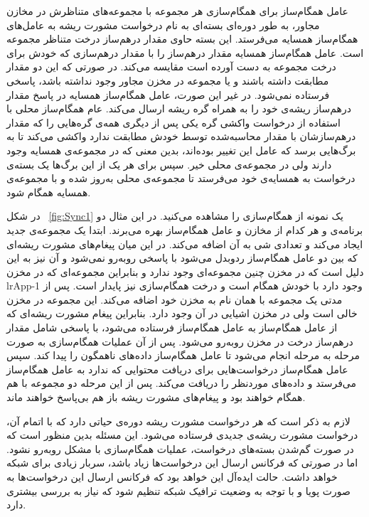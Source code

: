 عامل همگام‌ساز برای همگام‌سازی هر مجموعه با مجموعه‌های متناظرش در مخازن مجاور، به طور دوره‌ای بسته‌ای به نام درخواست مشورت ریشه به عامل‌های همگام‌ساز همسایه می‌فرستد. این بسته حاوی مقدار درهم‌ساز درخت متناظر مجموعه است. عامل همگام‌ساز همسایه مقدار در‌هم‌ساز را با مقدار در‌هم‌سازی که خودش برای درخت مجموعه به دست آورده است مقایسه می‌کند. در صورتی که این دو مقدار مطابقت داشته باشند و یا مجموعه در مخزن مجاور وجود نداشته باشد، پاسخی فرستاده نمی‌شود. در غیر این صورت، عامل همگام‌ساز همسایه در پاسخ مقدار در‌هم‌ساز ریشه‌ی خود را به همراه گره ریشه ارسال می‌کند. عام همگام‌ساز محلی با استفاده از درخواست واکشی گره یکی پس از دیگری همه‌ی گره‌هایی را که مقدار در‌هم‌سازشان با مقدار محاسبه‌شده توسط خودش مطابقت ندارد واکشی می‌کند تا به برگ‌هایی برسد که عامل این تغییر بوده‌اند، بدین معنی که در مجموعه‌ی همسایه وجود دارند ولی در مجموعه‌ی محلی خیر. سپس برای هر یک از این برگ‌ها یک بسته‌ی درخواست به همسایه‌ی خود می‌فرستد تا مجموعه‌ی محلی به‌روز شده و با مجموعه‌ی همسایه همگام شود.
 	
در شکل ~\ref{fig:Sync1} یک نمونه از همگام‌سازی را مشاهده می‌کنید. در این مثال دو برنامه‌ی  و  هر کدام از مخازن و عامل همگام‌ساز بهره می‌برند. ابتدا  یک مجموعه‌ی جدید ایجاد می‌کند و تعدادی شی به آن اضافه می‌کند. در این میان پیغام‌های مشورت ریشه‌ای که بین دو عامل همگام‌ساز ردوبدل می‌شود با پاسخی روبه‌رو نمی‌شود و آن نیز به این دلیل است که در مخزن  چنین مجموعه‌ای وجود ندارد و بنابراین مجموعه‌ای که در مخزن lr{App-1} وجود دارد با خودش همگام است و درخت همگام‌سازی نیز پایدار است. پس از مدتی  یک مجموعه با همان نام به مخزن خود اضافه می‌کند. این مجموعه در مخزن  خالی است ولی در مخزن  اشیایی در آن وجود دارد. بنابراین پیغام مشورت ریشه‌ای که از عامل همگام‌ساز  به عامل همگام‌ساز  فرستاده می‌شود، با پاسخی شامل مقدار درهم‌ساز درخت در مخزن  روبه‌رو می‌شود. پس از آن عملیات همگام‌سازی به صورت مرحله به مرحله انجام می‌شود تا عامل همگام‌ساز  داده‌های ناهمگون را پیدا کند. سپس عامل همگام‌ساز  درخواست‌هایی برای دریافت محتوایی که ندارد به عامل همگام‌ساز  می‌فرستد و داده‌های موردنظر را دریافت می‌کند. پس از این مرحله دو مجموعه با هم همگام خواهند بود و پیغام‌های مشورت ریشه باز هم بی‌پاسخ خواهند ماند.

لازم به ذکر است که هر درخواست مشورت ریشه دوره‌ی حیاتی دارد که با اتمام آن، درخواست مشورت ریشه‌ی جدیدی فرستاده می‌شود. این مسئله بدین منظور است که در صورت گم‌شدن  بسته‌های درخواست، عملیات همگام‌سازی با مشکل روبه‌رو نشود. اما در صورتی که فرکانس ارسال این درخواست‌ها زیاد باشد، سربار زیادی برای شبکه خواهد داشت. حالت ایده‌آل این خواهد بود که فرکانس ارسال این درخواست‌ها به صورت پویا و با توجه به وضعیت ترافیک شبکه تنظیم شود که نیاز به بررسی بیشتری دارد.

